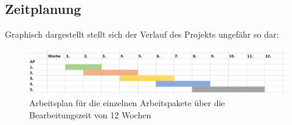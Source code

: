 \subsection{Zeitplanung}

Graphisch dargestellt stellt sich der Verlauf des Projekts ungefähr so dar:

\begin{figure}[h]
	\begin{center}
		\includegraphics[scale=0.5]{Zeitplan_graphisch.jpg}
		\caption{Arbeitsplan für die einzelnen Arbeitspakete über die Bearbeitungszeit von 12 Wochen}
	\end{center}
\end{figure}


















